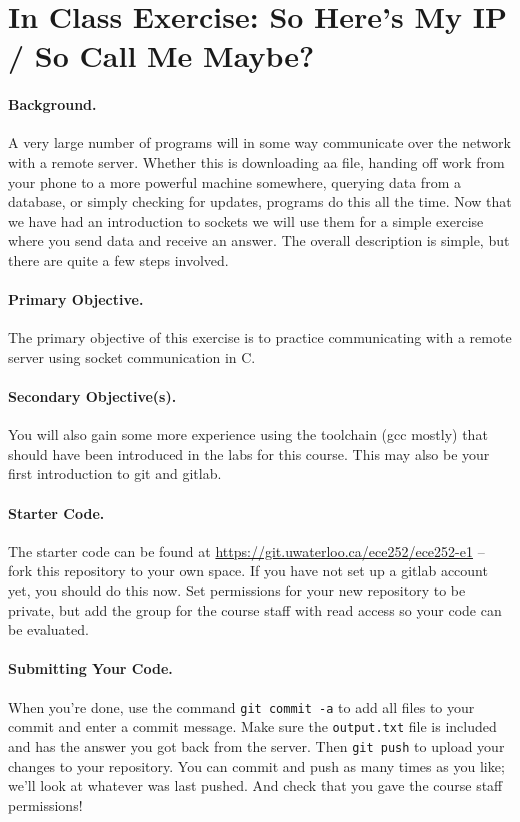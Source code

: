 




\section*{In Class Exercise: So Here's My IP / So Call Me Maybe?}

\paragraph{Background.}
A very large number of programs will in some way communicate over the network with a remote server. Whether this is downloading aa file, handing off work from your phone to a more powerful machine somewhere, querying data from a database, or simply checking for updates, programs do this all the time. Now that we have had an introduction to sockets we will use them for a simple exercise where you send data and receive an answer. The overall description is simple, but there are quite a few steps involved.

\paragraph{Primary Objective.} The primary objective of this exercise is to practice communicating with a remote server using socket communication in C. 

\paragraph{Secondary Objective(s).} You will also gain some more experience using the toolchain (gcc mostly) that should have been introduced in the labs for this course. This may also be your first introduction to git and gitlab.

\paragraph{Starter Code.} The starter code can be found at \url{https://git.uwaterloo.ca/ece252/ece252-e1} -- fork this repository to your own space. If you have not set up a gitlab account yet, you should do this now. Set permissions for your new repository to be private, but add the group for the course staff with read access so your code can be evaluated. 

\paragraph{Submitting Your Code.} When you're done, use the command \texttt{git commit -a} to add all files to your commit and enter a commit message. Make sure the \texttt{output.txt} file is included and has the answer you got back from the server. Then \texttt{git push} to upload your changes to your repository. You can commit and push as many times as you like; we'll look at whatever was last pushed. And check that you gave the course staff permissions!

